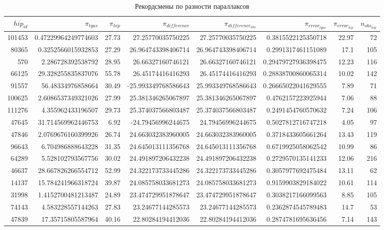 \documentclass[14pt]{article} %
\begin{document}
\begin{landscape}
\begin{spacing}{1.0}
\begin{table}[h]
\caption{Рекордсмены по разности параллаксов}
\label{tabular:75_50}
\begin{tabular}{|r|r|r|r|r|r|r|r|}
\hline 	
$hip_{id}$ &$\pi_{tgas}$ &$\pi_{hip}$ &$\pi_{difference}$ &$\pi_{difference_{abs}}$ &$\pi_{error_{tgas}}$ &$\pi_{error_{hip}}$ &$n_{obs_{hip}}$\\
\hline 
101453&0.47229964249774603&27.73&27.25770035750225&27.25770035750225&0.3815522125350718&22.97&72\\
80365&0.3252566015932853&27.29&26.964743398406714&26.964743398406714&0.2991317461151089&17.1&105\\
570&2.286728392538792&28.95&26.66327160746121&26.66327160746121&0.29479727936398475&12.23&116\\
66125&29.328255835837076&55.78&26.45174416416293&26.45174416416293&0.28838700860065314&10.02&142\\
91557&56.48334976858664&30.49&-25.993349768586643&25.993349768586643&0.26665022041629555&7.89&71\\
100625&2.6086537349321026&27.99&25.381346265067897&25.381346265067897&0.4762157223925944&7.06&88\\
111276&4.355962433196507&29.73&25.374037566803487&25.374037566803487&0.2491454760570632&7.24&106\\
47645&31.714569962446753&6.92&-24.79456996244675&24.79456996244675&0.5027812716747218&4.05&97\\
47846&2.0769676160399926&26.74&24.663032383960005&24.663032383960005&0.3718433605661264&13.43&119\\
96643&6.704986888643228&31.35&24.645013111356768&24.645013111356768&0.6719925058062542&10.99&86\\
64289&5.528102793567756&30.02&24.491897206432238&24.491897206432238&0.2729570135141233&12.06&216\\
46637&28.667826266554712&52.99&24.322173733445286&24.322173733445286&0.3057977692475484&13.11&62\\
14137&15.784241966318724&39.87&24.085758033681273&24.085758033681273&0.9159903829184022&10.61&114\\
31998&1.4152700481213487&24.89&23.474729951878647&23.474729951878647&0.3038217166099563&8.85&105\\
74143&4.583228557144263&27.83&23.24677144285573&23.24677144285573&0.2362874545789483&14.7&53\\
47839&17.35715805587964&40.16&22.80284194412036&22.80284194412036&0.2874781695636456&7.14&143\\

\end{tabular}
\end{table}
\end{spacing}
\end{landscape}
\end{document}

